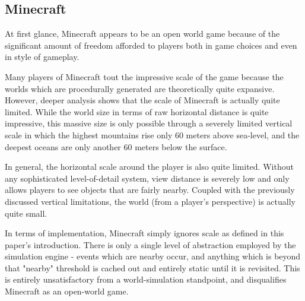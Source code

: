 \subsection{Minecraft}

At first glance, Minecraft appears to be an open world game because of the significant amount of freedom afforded to players both in game choices and even in style of gameplay.

Many players of Minecraft tout the impressive scale of the game because the worlds which are procedurally generated are theoretically quite expansive. However, deeper analysis shows that the scale of Minecraft is actually quite limited. While the world size in terms of raw horizontal distance is quite impressive, this massive size is only possible through a severely limited vertical scale in which the highest mountains rise only 60 meters above sea-level, and the deepest oceans are only another 60 meters below the surface.

In general, the horizontal scale around the player is also quite limited. Without any sophisticated level-of-detail system, view distance is severely low
and only allows players to see objects that are fairly nearby. Coupled with the previously discussed vertical limitations, the world (from a player's perspective) is actually quite small.

In terms of implementation, Minecraft simply ignores scale as defined in this paper's introduction. There is only a single level of abstraction employed by
the simulation engine - events which are nearby occur, and anything which is beyond that "nearby" threshold is cached out and entirely static until it is
revisited. This is entirely unsatisfactory from a world-simulation standpoint, and disqualifies Minecraft as an open-world game.

